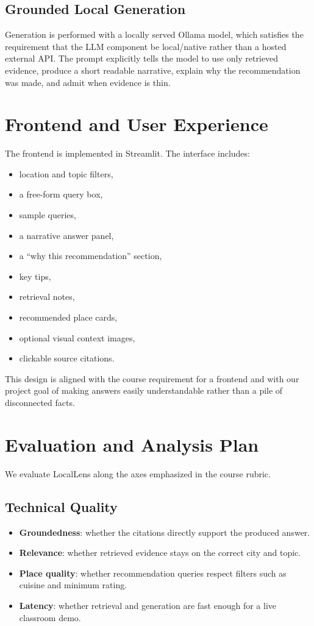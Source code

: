 \documentclass[11pt]{article}
\begin{document}
\subsection{Grounded Local Generation}
Generation is performed with a locally served Ollama model, which satisfies the requirement that the LLM component be local/native rather than a hosted external API. The prompt explicitly tells the model to use only retrieved evidence, produce a short readable narrative, explain why the recommendation was made, and admit when evidence is thin.

\section{Frontend and User Experience}
The frontend is implemented in Streamlit. The interface includes:
\begin{itemize}[leftmargin=*]
    \item location and topic filters,
    \item a free-form query box,
    \item sample queries,
    \item a narrative answer panel,
    \item a ``why this recommendation'' section,
    \item key tips,
    \item retrieval notes,
    \item recommended place cards,
    \item optional visual context images,
    \item clickable source citations.
\end{itemize}

This design is aligned with the course requirement for a frontend and with our project goal of making answers easily understandable rather than a pile of disconnected facts.

\section{Evaluation and Analysis Plan}
We evaluate LocalLens along the axes emphasized in the course rubric.

\subsection*{Technical Quality}
\begin{itemize}[leftmargin=*]
    \item \textbf{Groundedness}: whether the citations directly support the produced answer.
    \item \textbf{Relevance}: whether retrieved evidence stays on the correct city and topic.
    \item \textbf{Place quality}: whether recommendation queries respect filters such as cuisine and minimum rating.
    \item \textbf{Latency}: whether retrieval and generation are fast enough for a live classroom demo.
\end{itemize}
\end{document}

